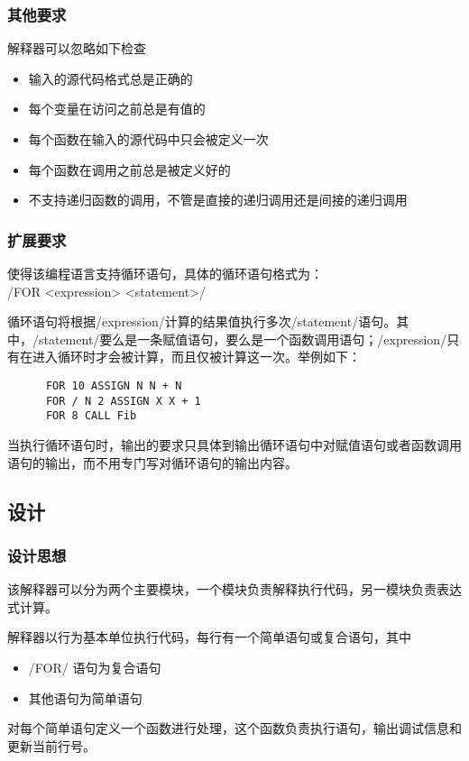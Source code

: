 \documentclass[UTF8]{ctexart}
\begin{document}
      \subsubsection{其他要求}
        解释器可以忽略如下检查
        \begin{itemize}
          \item 输入的源代码格式总是正确的
          \item 每个变量在访问之前总是有值的
          \item 每个函数在输入的源代码中只会被定义一次
          \item 每个函数在调用之前总是被定义好的
          \item 不支持递归函数的调用，不管是直接的递归调用还是间接的递归调用
        \end{itemize}
      \subsubsection{扩展要求}
      使得该编程语言支持循环语句，具体的循环语句格式为：\\\code/FOR <expression> <statement>/

      循环语句将根据\code/expression/计算的结果值执行多次\code/statement/语句。其中，\code/statement/要么是一条赋值语句，要么是一个函数调用语句；\code/expression/只有在进入循环时才会被计算，而且仅被计算这一次。举例如下：
      \begin{verbatim}
      FOR 10 ASSIGN N N + N
      FOR / N 2 ASSIGN X X + 1
      FOR 8 CALL Fib
      \end{verbatim}
      当执行循环语句时，输出的要求只具体到输出循环语句中对赋值语句或者函数调用语句的输出，而不用专门写对循环语句的输出内容。

    \subsection{设计}
      \subsubsection{设计思想}
        该解释器可以分为两个主要模块，一个模块负责解释执行代码，另一模块负责表达式计算。

        解释器以行为基本单位执行代码，每行有一个简单语句或复合语句，其中
        \begin{itemize}
          \item \code/FOR/ 语句为复合语句
          \item 其他语句为简单语句
        \end{itemize}
        对每个简单语句定义一个函数进行处理，这个函数负责执行语句，输出调试信息和更新当前行号。
\end{document}

